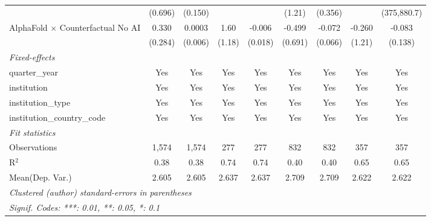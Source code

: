 \begin{tabular}{lcccccccc}
                                            & (0.696) & (0.150) &         &         & (1.21)  & (0.356) &         & (375,880.7)\\   
   AlphaFold $\times$ Counterfactual No AI  & 0.330   & 0.0003  & 1.60    & -0.006  & -0.499  & -0.072  & -0.260  & -0.083\\   
                                            & (0.284) & (0.006) & (1.18)  & (0.018) & (0.691) & (0.066) & (1.21)  & (0.138)\\   
   \midrule
   \emph{Fixed-effects}\\
   quarter\_year                            & Yes     & Yes     & Yes     & Yes     & Yes     & Yes     & Yes     & Yes\\  
   institution                              & Yes     & Yes     & Yes     & Yes     & Yes     & Yes     & Yes     & Yes\\  
   institution\_type                        & Yes     & Yes     & Yes     & Yes     & Yes     & Yes     & Yes     & Yes\\  
   institution\_country\_code               & Yes     & Yes     & Yes     & Yes     & Yes     & Yes     & Yes     & Yes\\  
   \midrule
   \emph{Fit statistics}\\
   Observations                             & 1,574   & 1,574   & 277     & 277     & 832     & 832     & 357     & 357\\  
   R$^2$                                    & 0.38    & 0.38    & 0.74    & 0.74    & 0.40    & 0.40    & 0.65    & 0.65\\  
Mean(Dep. Var.) & 2.605 & 2.605 & 2.637 & 2.637 & 2.709 & 2.709 & 2.622 & 2.622 \\
   \midrule \midrule
   \multicolumn{9}{l}{\emph{Clustered (author) standard-errors in parentheses}}\\
   \multicolumn{9}{l}{\emph{Signif. Codes: ***: 0.01, **: 0.05, *: 0.1}}\\
\end{tabular}
\par\endgroup
